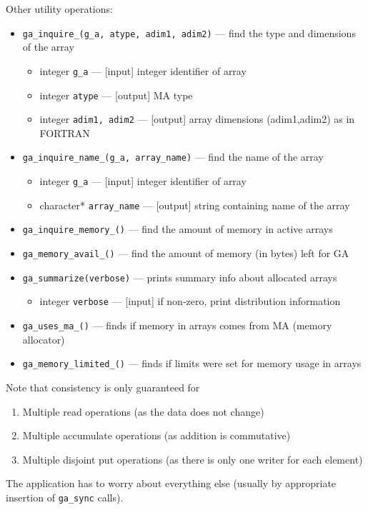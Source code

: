 \begin{itemize}
\end{itemize}

Other utility operations:
\begin{itemize}
\item {\tt ga\_inquire\_(g\_a, atype, adim1, adim2)} --- find the type and 
                    dimensions of the array
\begin{itemize}
\item     integer {\tt g\_a}        --- [input] integer identifier of array
\item     integer {\tt atype}       --- [output] MA type
\item     integer {\tt adim1, adim2} --- [output] array dimensions (adim1,adim2) as in FORTRAN
\end{itemize}

\item {\tt ga\_inquire\_name\_(g\_a, array\_name)} --- find the name of the array
\begin{itemize}
\item     integer {\tt g\_a}         --- [input] integer identifier of array
\item     character* {\tt array\_name}  --- [output] string containing name of the array
\end{itemize}

\item {\tt ga\_inquire\_memory\_()} --- find the amount of memory in
  active arrays
\item {\tt ga\_memory\_avail\_()} --- find the amount of memory (in bytes) left for
  GA
\item {\tt ga\_summarize(verbose)} --- prints summary info about allocated
  arrays
\begin{itemize}
\item     integer {\tt verbose}     --- [input] if non-zero, print distribution information
\end{itemize}

\item {\tt ga\_uses\_ma\_()} --- finds if memory in arrays comes from MA
  (memory allocator)
\item {\tt ga\_memory\_limited\_()} --- finds if limits were set for
  memory usage in arrays
\end{itemize}

Note that consistency is only guaranteed for
\begin{enumerate}
\item Multiple read operations (as the data does not change)
\item Multiple accumulate operations (as addition is commutative)
\item Multiple disjoint put operations (as there is only one writer
  for each element)
\end{enumerate}
The application has to worry about everything else (usually by
appropriate insertion of {\tt ga\_sync} calls).

